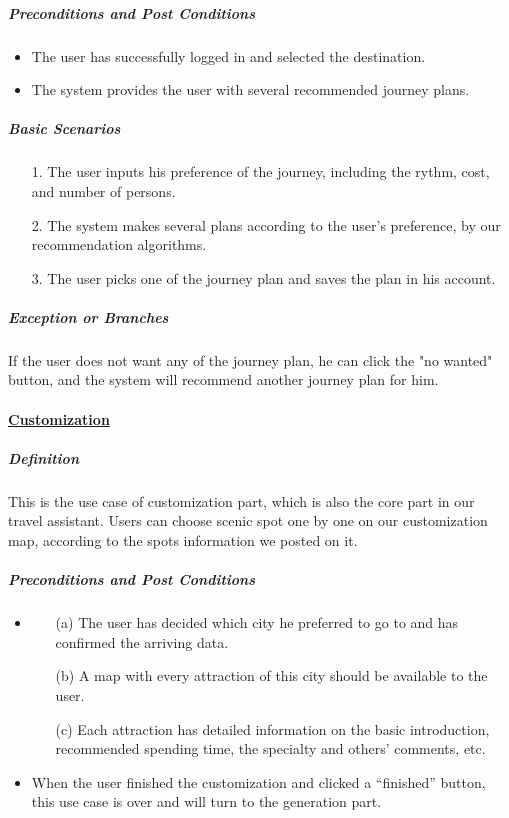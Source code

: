 \documentclass[10pt]{article}
\begin{document}
\begin{itemize}
		\subparagraph{Preconditions and Post Conditions}
		\begin{itemize}
			\item The user has successfully logged in and selected the destination.
			\item The system provides the user with several recommended journey plans.
		\end{itemize}

		\subparagraph{Basic Scenarios}
		\begin{itemize}
			\item[1.] The user inputs his preference of the journey, including the rythm, cost, and number of persons.
			\item[2.]The system makes several plans according to the user's preference, by our recommendation algorithms.
			\item[3.]The user picks one of the journey plan and saves the plan in his account.
		
		\end{itemize}

		\subparagraph{Exception or Branches}
		If the user does not want any of the journey plan, he can click the "no wanted" button, and the system will recommend another journey plan for him.

		\paragraph{\underline{Customization}}
		\subparagraph{Definition}
		This is the use case of customization part, which is also the core part in our travel assistant. Users can choose scenic spot one by one on our customization map, according to the spots information we posted on it.

		\subparagraph{Preconditions and Post Conditions}
		\begin{itemize}
			\item \begin{itemize}
				\item[(a)] The user has decided which city he preferred to go to and has confirmed the arriving data.
				\item[(b)] A map with every attraction of this city should be available to the user.
				\item[(c)] Each attraction has detailed information on the basic introduction, recommended spending time, the specialty and others’ comments, etc. 
			\end{itemize}
			\item When the user finished the customization and clicked a “finished” button, this use case is over and will turn to the generation part.
		\end{itemize}


\end{itemize}
\end{document}
